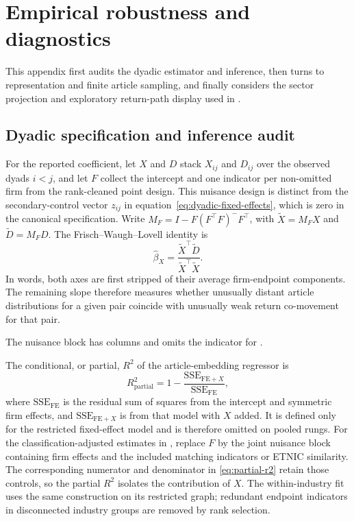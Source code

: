 \section{Empirical robustness and diagnostics}
\label{sec:empirical-robustness}

This appendix first audits the dyadic estimator and inference, then turns to
representation and finite article sampling, and finally considers the sector
projection and exploratory return-path display used in .

\subsection{Dyadic specification and inference audit}
\label{sec:dyadic-diagnostics}
\label{sec:resampling-formulas}

For the reported coefficient, let $X$ and $D$ stack $X_{ij}$ and $D_{ij}$ over
the observed dyads $i<j$, and let $F$ collect the intercept and one indicator
per non-omitted firm from the rank-cleaned point design. This nuisance design
is distinct from the secondary-control vector $z_{ij}$ in
equation~\ref{eq:dyadic-fixed-effects}, which is zero in the canonical
specification. Write $M_F=I-F(F^{\top}F)^{-}F^{\top}$, with
$\widetilde X=M_F X$ and $\widetilde D=M_F D$. The
Frisch--Waugh--Lovell identity is
\begin{equation}\label{eq:fwl-identity}
  \widehat\beta_X
  =\frac{\widetilde X^{\top}\widetilde D}{\widetilde X^{\top}\widetilde X}.
\end{equation}
In words, both axes are first stripped of their average firm-endpoint
components. The remaining slope therefore measures whether unusually distant
article distributions for a given pair coincide with unusually weak return
co-movement for that pair.

The nuisance block has  columns and
omits the indicator for \texttt{}.

The conditional, or partial, $R^2$ of the article-embedding regressor is
\begin{equation}\label{eq:partial-r2}
  R^2_{\mathrm{partial}}
  =1-\frac{\mathrm{SSE}_{\mathrm{FE}+X}}{\mathrm{SSE}_{\mathrm{FE}}},
\end{equation}
where $\mathrm{SSE}_{\mathrm{FE}}$ is the residual sum of squares from the
intercept and symmetric firm effects, and $\mathrm{SSE}_{\mathrm{FE}+X}$ is
from that model with $X$ added. It is defined only for the restricted
fixed-effect model and is therefore omitted on pooled rungs.
For the classification-adjusted estimates in
, replace $F$ by the joint nuisance block
containing firm effects and the included matching indicators or ETNIC
similarity.
The corresponding numerator and denominator in \eqref{eq:partial-r2} retain
those controls, so the partial $R^2$ isolates the contribution of $X$.
The within-industry fit uses the same construction on its restricted graph;
redundant endpoint indicators in disconnected industry groups are removed
by rank selection.


